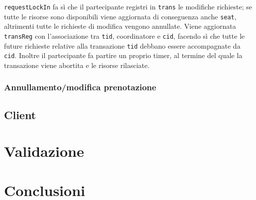 \documentclass[a4paper]{article}
\begin{document}
\texttt{requestLockIn} fa sì che il partecipante registri in \texttt{trans} le modifiche richieste; se tutte le risorse sono disponibili viene aggiornata di conseguenza anche \texttt{seat}, altrimenti tutte le richieste di modifica vengono annullate. Viene aggiornata \texttt{transReg} con l'associazione tra \texttt{tid}, coordinatore e \texttt{cid}, facendo sì che tutte le future richieste relative alla transazione \texttt{tid} debbano essere accompagnate da \texttt{cid}.
Inoltre il partecipante fa partire un proprio timer, al termine del quale la transazione viene abortita e le risorse rilasciate.





\subsubsection{Annullamento/modifica prenotazione}

\subsection{Client}



\section{Validazione}


\section{Conclusioni}


\appendix
\end{document}
